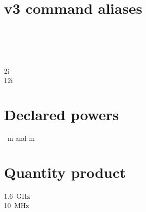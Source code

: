 \documentclass{article}
\newcommand{\qtyhy}[2]{\qty[quantity-product = \text{-}]{#1}{#2}}
\begin{document}
\section{v3 command aliases}

\\
\\
\\
\\
\num{2i}\\
\num[complex-root-position = before-number]{1+2i}\\

\section{Declared powers}

\unit{\quartic\metre} and \unit{\metre\tothefourth}\\

\section{Quantity product}

\qty{1.6}{\giga\hertz}\\
\qtyhy{10}{\mega\hertz}\\
\end{document}
